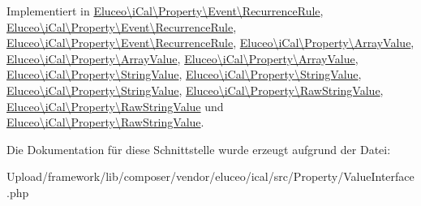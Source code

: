 Implementiert in \mbox{\hyperlink{class_eluceo_1_1i_cal_1_1_property_1_1_event_1_1_recurrence_rule_aeefc9e0958f7fbd8fc54d622c6fec793}{Eluceo\textbackslash{}i\+Cal\textbackslash{}\+Property\textbackslash{}\+Event\textbackslash{}\+Recurrence\+Rule}}, \mbox{\hyperlink{class_eluceo_1_1i_cal_1_1_property_1_1_event_1_1_recurrence_rule_aeefc9e0958f7fbd8fc54d622c6fec793}{Eluceo\textbackslash{}i\+Cal\textbackslash{}\+Property\textbackslash{}\+Event\textbackslash{}\+Recurrence\+Rule}}, \mbox{\hyperlink{class_eluceo_1_1i_cal_1_1_property_1_1_event_1_1_recurrence_rule_aeefc9e0958f7fbd8fc54d622c6fec793}{Eluceo\textbackslash{}i\+Cal\textbackslash{}\+Property\textbackslash{}\+Event\textbackslash{}\+Recurrence\+Rule}}, \mbox{\hyperlink{class_eluceo_1_1i_cal_1_1_property_1_1_array_value_ac3af9696c29dc74c2e1ab7ca220c4228}{Eluceo\textbackslash{}i\+Cal\textbackslash{}\+Property\textbackslash{}\+Array\+Value}}, \mbox{\hyperlink{class_eluceo_1_1i_cal_1_1_property_1_1_array_value_ac3af9696c29dc74c2e1ab7ca220c4228}{Eluceo\textbackslash{}i\+Cal\textbackslash{}\+Property\textbackslash{}\+Array\+Value}}, \mbox{\hyperlink{class_eluceo_1_1i_cal_1_1_property_1_1_array_value_ac3af9696c29dc74c2e1ab7ca220c4228}{Eluceo\textbackslash{}i\+Cal\textbackslash{}\+Property\textbackslash{}\+Array\+Value}}, \mbox{\hyperlink{class_eluceo_1_1i_cal_1_1_property_1_1_string_value_a76f74785d3f3bd3533c40090d2340c01}{Eluceo\textbackslash{}i\+Cal\textbackslash{}\+Property\textbackslash{}\+String\+Value}}, \mbox{\hyperlink{class_eluceo_1_1i_cal_1_1_property_1_1_string_value_a76f74785d3f3bd3533c40090d2340c01}{Eluceo\textbackslash{}i\+Cal\textbackslash{}\+Property\textbackslash{}\+String\+Value}}, \mbox{\hyperlink{class_eluceo_1_1i_cal_1_1_property_1_1_string_value_a76f74785d3f3bd3533c40090d2340c01}{Eluceo\textbackslash{}i\+Cal\textbackslash{}\+Property\textbackslash{}\+String\+Value}}, \mbox{\hyperlink{class_eluceo_1_1i_cal_1_1_property_1_1_raw_string_value_a4759366e5ac3a3eb9c4b57704c71b05f}{Eluceo\textbackslash{}i\+Cal\textbackslash{}\+Property\textbackslash{}\+Raw\+String\+Value}}, \mbox{\hyperlink{class_eluceo_1_1i_cal_1_1_property_1_1_raw_string_value_a4759366e5ac3a3eb9c4b57704c71b05f}{Eluceo\textbackslash{}i\+Cal\textbackslash{}\+Property\textbackslash{}\+Raw\+String\+Value}} und \mbox{\hyperlink{class_eluceo_1_1i_cal_1_1_property_1_1_raw_string_value_a4759366e5ac3a3eb9c4b57704c71b05f}{Eluceo\textbackslash{}i\+Cal\textbackslash{}\+Property\textbackslash{}\+Raw\+String\+Value}}.



Die Dokumentation für diese Schnittstelle wurde erzeugt aufgrund der Datei\+:\begin{DoxyCompactItemize}
\item 
Upload/framework/lib/composer/vendor/eluceo/ical/src/\+Property/Value\+Interface.\+php\end{DoxyCompactItemize}
